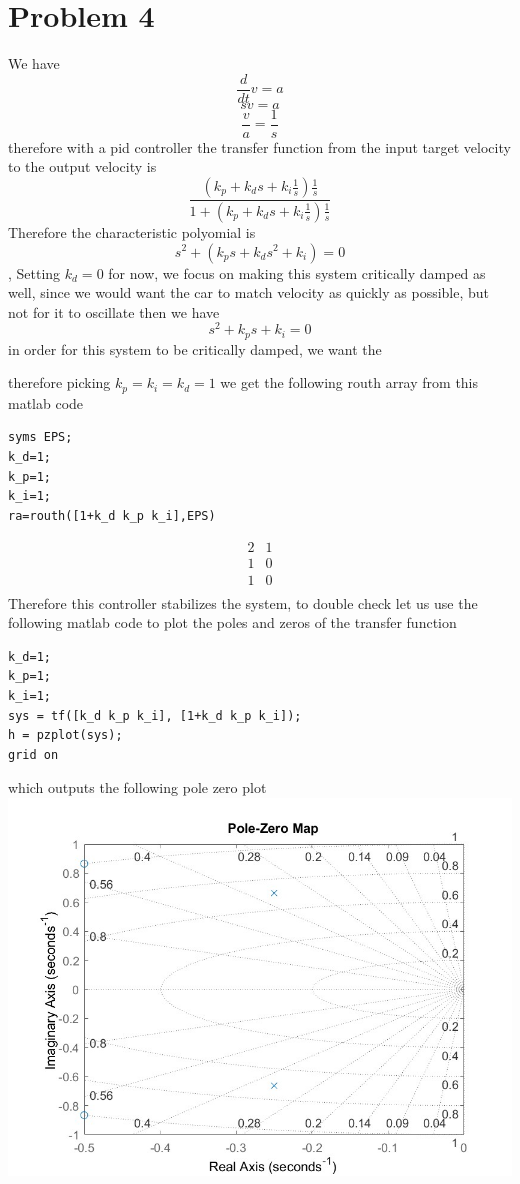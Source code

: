 \documentclass[12pt]{article}
\begin{document}
\section*{Problem 4}
We have
$$\frac{d}{dt}v=a$$
$$sv=a$$
$$\frac{v}{a}=\frac{1}{s}$$
therefore with a pid controller the transfer function from the input target velocity to the output velocity is 
$$\frac{(k_p+k_ds+k_i\frac{1}{s})\frac{1}{s}}{1+(k_p+k_ds+k_i\frac{1}{s})\frac{1}{s}}$$
Therefore the characteristic polyomial is
$$s^2+(k_ps+k_ds^2+k_i)=0$$, Setting $k_d=0$ for now, we focus on making this system critically damped as well, since we would want
the car to match velocity as quickly as possible, but not for it to oscillate
then we have
$$s^2+k_ps+k_i=0$$
in order for this system to be critically damped, we want the 


therefore picking $k_p=k_i=k_d=1$ we get the following routh array from this matlab code
\begin{verbatim}
syms EPS;
k_d=1;
k_p=1;
k_i=1;
ra=routh([1+k_d k_p k_i],EPS)
\end{verbatim}
$$\begin{matrix}
    2 & 1\\
    1 & 0\\
    1 & 0\\
\end{matrix}$$
Therefore this controller stabilizes the system, to double check let us use the following matlab code to plot the poles and zeros of the transfer function
\begin{verbatim}
k_d=1;
k_p=1;
k_i=1;
sys = tf([k_d k_p k_i], [1+k_d k_p k_i]);
h = pzplot(sys);
grid on
\end{verbatim}
which outputs the following pole zero plot\\
\includegraphics[scale=0.4]{Problem4Fig1.jpg}\\
\end{document}
